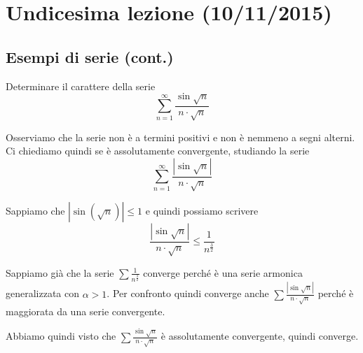 \chapter{Undicesima lezione (10/11/2015)}

\section{Esempi di serie (cont.)}

\begin{example}
Determinare il carattere della serie
\begin{equation*}
\sum_{n=1}^\infty \frac{\sin \sqrt{n}}{n \cdot \sqrt{n}}
\end{equation*}

Osserviamo che la serie non è a termini positivi e non è nemmeno a segni alterni. Ci chiediamo quindi se è assolutamente convergente, studiando la serie
\begin{equation*}
\sum_{n=1}^\infty \frac{|\sin \sqrt{n}|}{n \cdot \sqrt{n}}
\end{equation*}

Sappiamo che $|\sin(\sqrt{n})| \le 1$ e quindi possiamo scrivere
\begin{equation*}
\frac{|\sin\sqrt{n}|}{n \cdot \sqrt{n}} \le \frac{1}{n^{\frac{3}{2}}}
\end{equation*}

Sappiamo già che la serie $\sum \frac{1}{n^\frac{3}{2}}$ converge perché è una serie armonica generalizzata con $\alpha > 1$. Per confronto quindi converge anche $\sum \frac{|\sin\sqrt{n}|}{n \cdot \sqrt{n}}$ perché è maggiorata da una serie convergente.

Abbiamo quindi visto che $\sum \frac{\sin \sqrt{n}}{n \cdot \sqrt{n}}$ è assolutamente convergente, quindi converge.
\end{example}

